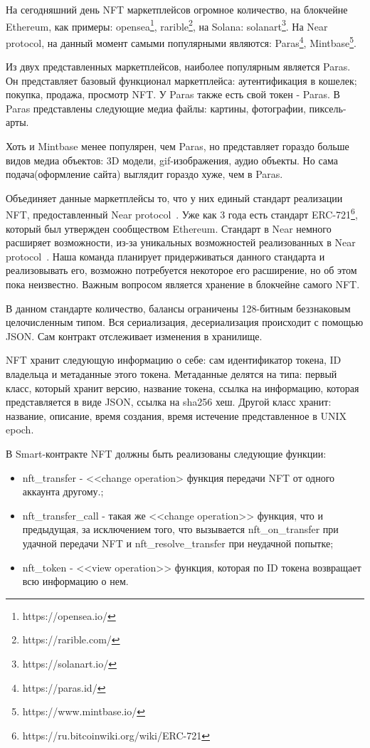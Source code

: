 
    На сегодняшний день NFT маркетплейсов огромное количество, на блокчейне Ethereum, как примеры: opensea\footnote{https://opensea.io/}, rarible\footnote{https://rarible.com/}, на Solana: solanart\footnote{https://solanart.io/}. На Near protocol, на данный момент самыми популярными являются: Paras\footnote{https://paras.id/}, Mintbase\footnote{https://www.mintbase.io/}.

    Из двух представленных маркетплейсов, наиболее популярным является Paras. Он представляет базовый функционал маркетплейса: аутентификация в кошелек; покупка, продажа, просмотр NFT. У Paras также есть свой токен - Paras. В Paras представлены следующие медиа файлы: картины, фотографии, пиксель-арты.

    Хоть и Mintbase менее популярен, чем Paras, но представляет гораздо больше видов медиа объектов: 3D модели, gif-изображения, аудио объекты. Но сама подача(оформление сайта) выглядит гораздо хуже, чем в Paras.

    Объединяет данные маркетплейсы то, что у них единый стандарт реализации NFT, предоставленный Near protocol~\cite*{nearspec}. Уже как 3 года есть стандарт ERC-721\footnote{https://ru.bitcoinwiki.org/wiki/ERC-721}, который был утвержден сообществом Ethereum. Стандарт в Near немного расширяет возможности, из-за уникальных возможностей реализованных в Near protocol~\cite*{nearspec}. Наша команда планирует придерживаться данного стандарта и реализовывать его, возможно потребуется некоторое его расширение, но об этом пока неизвестно. Важным вопросом является хранение в блокчейне самого NFT.

    В данном стандарте количество, балансы ограничены 128-битным беззнаковым целочисленным типом. Вся сериализация, десериализация происходит с помощью JSON. Сам контракт отслеживает изменения в хранилище.

    NFT хранит следующую информацию о себе: сам идентификатор токена, ID владельца и метаданные этого токена. Метаданные делятся на типа: первый класс, который хранит версию, название токена, ссылка на информацию, которая представляется в виде JSON, ссылка на sha256 хеш. Другой класс хранит: название, описание, время создания, время истечение представленное в UNIX epoch.

    В Smart-контракте NFT должны быть реализованы следующие функции:

    \begin{itemize}
        \item nft\_transfer - <<change operation> функция передачи NFT от одного аккаунта другому.;
        \item nft\_transfer\_call - такая же <<change operation>> функция, что и предыдущая, за исключением того, что вызывается nft\_on\_transfer при удачной передачи NFT и nft\_resolve\_transfer при неудачной попытке;
        \item nft\_token - <<view operation>> функция, которая по ID токена возвращает всю информацию о нем.
    \end{itemize}
